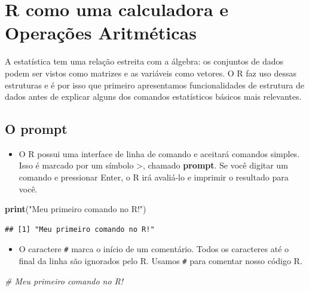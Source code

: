 \documentclass[
]{book}
\newenvironment{Shaded}{\begin{snugshade}}{\end{snugshade}}
\newcommand{\CommentTok}[1]{\textcolor[rgb]{0.56,0.35,0.01}{\textit{#1}}}
\newcommand{\FunctionTok}[1]{\textcolor[rgb]{0.13,0.29,0.53}{\textbf{#1}}}
\newcommand{\NormalTok}[1]{#1}
\newcommand{\StringTok}[1]{\textcolor[rgb]{0.31,0.60,0.02}{#1}}
\providecommand{\tightlist}{%
  \setlength{\itemsep}{0pt}\setlength{\parskip}{0pt}}
\theoremstyle{definition}
\theoremstyle{definition}
\theoremstyle{definition}
\theoremstyle{definition}
\theoremstyle{remark}
\begin{document}
\chapter{R como uma calculadora e Operações Aritméticas}\label{r-como-uma-calculadora-e-operauxe7uxf5es-aritmuxe9ticas}

A estatística tem uma relação estreita com a álgebra: os conjuntos de dados podem ser vistos como matrizes e as variáveis como vetores. O R faz uso dessas estruturas e é por isso que primeiro apresentamos funcionalidades de estrutura de dados antes de explicar alguns dos comandos estatísticos básicos mais relevantes.

\section{O prompt}\label{o-prompt}

\begin{itemize}
\tightlist
\item
  O R possui uma interface de linha de comando e aceitará comandos simples. Isso é marcado por um símbolo \textgreater, chamado \textbf{prompt}. Se você digitar um comando e pressionar Enter, o R irá avaliá-lo e imprimir o resultado para você.
\end{itemize}

\begin{Shaded}
\begin{Highlighting}[]
\FunctionTok{print}\NormalTok{(}\StringTok{"Meu primeiro comando no R!"}\NormalTok{)}
\end{Highlighting}
\end{Shaded}

\begin{verbatim}
## [1] "Meu primeiro comando no R!"
\end{verbatim}

\begin{itemize}
\tightlist
\item
  O caractere \texttt{\#} marca o início de um comentário. Todos os caracteres até o final da linha são ignorados pelo R. Usamos \texttt{\#} para comentar nosso código R.
\end{itemize}

\begin{Shaded}
\begin{Highlighting}[]
\CommentTok{\# Meu primeiro comando no R!}
\end{Highlighting}
\end{Shaded}
\end{document}
